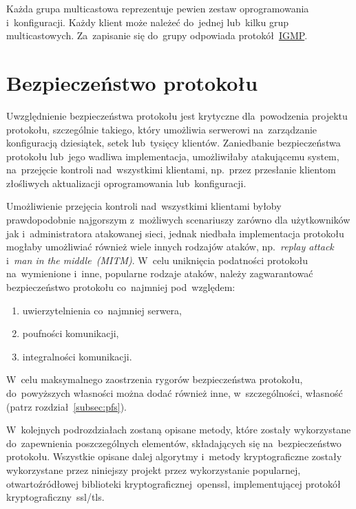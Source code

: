 \documentclass[thesis]{subfiles}
\begin{document}
Każda grupa multicastowa reprezentuje pewien zestaw oprogramowania i~konfiguracji. Każdy klient może należeć do~jednej lub~kilku grup multicastowych. Za~zapisanie się do~grupy odpowiada protokół~\href{https://en.wikipedia.org/wiki/Internet_Group_Management_Protocol}{IGMP}.


\section{Bezpieczeństwo protokołu}
\label{sec:security}

Uwzględnienie bezpieczeństwa protokołu jest krytyczne dla~powodzenia projektu protokołu, szczególnie takiego, który umożliwia serwerowi na~zarządzanie konfiguracją dziesiątek, setek lub~tysięcy klientów. Zaniedbanie bezpieczeństwa protokołu lub~jego wadliwa implementacja, umożliwiłaby atakującemu system, na~przejęcie kontroli nad~wszystkimi klientami, np.~przez przesłanie klientom złośliwych aktualizacji oprogramowania lub~konfiguracji.

Umożliwienie przejęcia kontroli nad~wszystkimi klientami byłoby prawdopodobnie najgorszym z~możliwych scenariuszy zarówno dla użytkowników jak i~administratora atakowanej sieci, jednak niedbała implementacja protokołu mogłaby umożliwiać również wiele innych rodzajów ataków, np.~\emph{replay attack} i~\emph{man in the middle~(MITM)}. W~celu uniknięcia podatności protokołu na~wymienione i~inne, popularne rodzaje ataków, należy zagwarantować bezpieczeństwo protokołu co~najmniej pod~względem:
\begin{enumerate}
\item uwierzytelnienia co~najmniej serwera,
\item poufności komunikacji,
\item integralności komunikacji.
\end{enumerate}
W~celu maksymalnego zaostrzenia rygorów bezpieczeństwa protokołu, do~powyższych własności można dodać również inne, w~szczególności, własność \emph{} (patrz rozdział~\ref{subsec:pfs}).

W~kolejnych podrozdziałach zostaną opisane metody, które zostały wykorzystane do~zapewnienia poszczególnych elementów, składających się na~bezpieczeństwo protokołu. Wszystkie opisane dalej algorytmy i~metody kryptograficzne zostały wykorzystane przez niniejszy projekt przez wykorzystanie popularnej, otwartoźródłowej biblioteki kryptograficznej~\gls{openssl}, implementującej protokół kryptograficzny~\gls{ssl/tls}.
\end{document}
